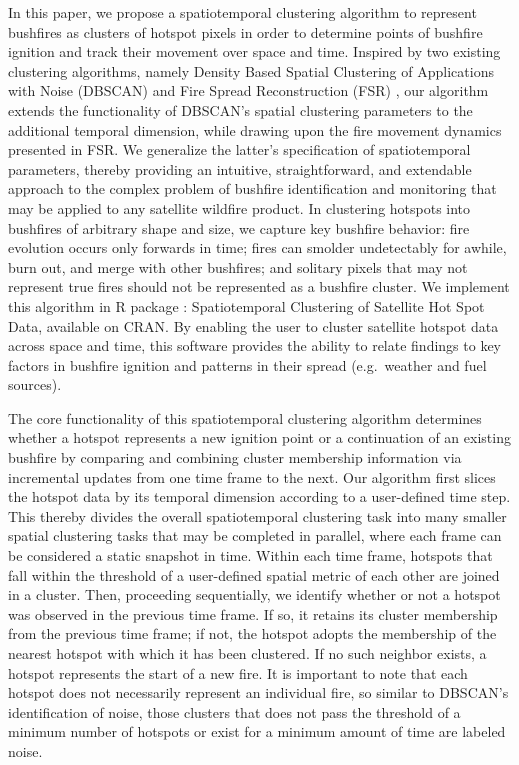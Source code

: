 In this paper, we propose a spatiotemporal clustering algorithm to
represent bushfires as clusters of hotspot pixels in order to determine
points of bushfire ignition and track their movement over space and
time. Inspired by two existing clustering algorithms, namely Density
Based Spatial Clustering of Applications with Noise (DBSCAN)
\citep{ester1996density} and Fire Spread Reconstruction (FSR)
\citep{Loboda2007}, our algorithm extends the functionality of DBSCAN's
spatial clustering parameters to the additional temporal dimension,
while drawing upon the fire movement dynamics presented in FSR. We
generalize the latter's specification of spatiotemporal parameters,
thereby providing an intuitive, straightforward, and extendable approach
to the complex problem of bushfire identification and monitoring that
may be applied to any satellite wildfire product. In clustering hotspots
into bushfires of arbitrary shape and size, we capture key bushfire
behavior: fire evolution occurs only forwards in time; fires can smolder
undetectably for awhile, burn out, and merge with other bushfires; and
solitary pixels that may not represent true fires should not be
represented as a bushfire cluster. We implement this algorithm in R
package : Spatiotemporal Clustering of Satellite Hot
Spot Data, available on CRAN. By enabling the user to cluster satellite
hotspot data across space and time, this software provides the ability
to relate findings to key factors in bushfire ignition and patterns in
their spread (e.g.~weather and fuel sources).

The core functionality of this spatiotemporal clustering algorithm
determines whether a hotspot represents a new ignition point or a
continuation of an existing bushfire by comparing and combining cluster
membership information via incremental updates from one time frame to
the next. Our algorithm first slices the hotspot data by its temporal
dimension according to a user-defined time step. This thereby divides
the overall spatiotemporal clustering task into many smaller spatial
clustering tasks that may be completed in parallel, where each frame can
be considered a static snapshot in time. Within each time frame,
hotspots that fall within the threshold of a user-defined spatial metric
of each other are joined in a cluster. Then, proceeding sequentially, we
identify whether or not a hotspot was observed in the previous time
frame. If so, it retains its cluster membership from the previous time
frame; if not, the hotspot adopts the membership of the nearest hotspot
with which it has been clustered. If no such neighbor exists, a hotspot
represents the start of a new fire. It is important to note that each
hotspot does not necessarily represent an individual fire, so similar to
DBSCAN's identification of noise, those clusters that does not pass the
threshold of a minimum number of hotspots or exist for a minimum amount
of time are labeled noise.

